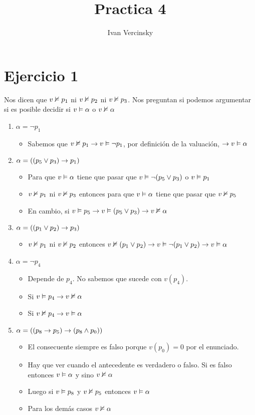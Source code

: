 \documentclass[14pt,a4paper,fleqn]{article}
\date{}
\author{Ivan Vercinsky}
\title{Practica 4}
\begin{document}
\maketitle

\section*{Ejercicio 1}
Nos dicen que $v \nvDash p_1$ ni  $v \nvDash p_2$ ni  $v \nvDash p_3$. Nos preguntan si podemos argumentar si es posible decidir si $v \vDash \alpha$ o $v \nvDash \alpha$
\begin{enumerate}
	\item $\alpha = \neg p_1$
	\begin{itemize}
		\item Sabemos que $v \nvDash p_1 \rightarrow v \vDash \neg p_1$, por definición de la valuación, $\rightarrow v \vDash \alpha$
	\end{itemize}
	\item $\alpha = (( p_5 \vee p_3) \rightarrow p_1)$
	\begin{itemize}
		\item Para que $v \vDash \alpha$ tiene que pasar que $v \vDash \neg (p_5 \vee p_3)$ o $v \vDash p_1$
		\item $v \nvDash p_1 $ ni  $v \nvDash p_3$ entonces para que $v \vDash \alpha$ tiene que pasar que $v \nvDash p_5$
		\item En cambio, si $v \vDash p_5 \rightarrow v \vDash (p_5 \vee p_3) \rightarrow v \nvDash \alpha$ 
	\end{itemize}
	\item $\alpha = (( p_1 \vee p_2) \rightarrow p_3)$
	\begin{itemize}
		\item $v \nvDash p_1$ ni $v \nvDash p_2$ entonces $v \nvDash (p_1 \vee p_2) \rightarrow v \vDash \neg(p_1 \vee p_2) \rightarrow v \vDash \alpha$
	\end{itemize}
	\item $\alpha = \neg p_4$
	\begin{itemize}
		\item Depende de $p_4$. No sabemos que sucede con $v(p_4)$.
		\item Si $v \vDash p_4 \rightarrow v \nvDash \alpha$
		\item Si $v \nvDash p_4 \rightarrow v \vDash \alpha$
	\end{itemize}
	\item $\alpha = ((p_8 \rightarrow p_5) \rightarrow (p_8 \wedge p_0))$
	\begin{itemize}
		\item El consecuente siempre es falso porque $v(p_0) = 0$ por el enunciado.
		\item Hay que ver cuando el antecedente es verdadero o falso. Si es falso entonces $v \vDash \alpha$ y sino $v \nvDash \alpha$
		\item Luego si $v \vDash p_8 $ y $v \nvDash p_5 $ entonces $v \vDash \alpha$
		\item Para los demás casos $v \nvDash \alpha$
	\end{itemize}
\end{enumerate}
\end{document}
